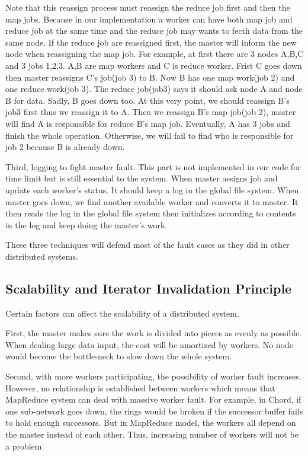 \documentclass[12pt]{article}
\begin{document}
Note that this reassign process must reassign the reduce job first and then the map jobs. Because in our implementation a worker can have both map job and reduce job at the same time and the reduce job may wants to fecth data from the same node. If the reduce job are reassigned first, the master will inform the new node when reassigning the map job. For example, at first there are 3 nodes A,B,C and 3 jobs 1,2,3. A,B are map workers and C is reduce worker. Frist C goes down then master reassigns C's job(job 3) to B. Now B has one map work(job 2) and one reduce work(job 3). The reduce job(job3) says it should ask node A and node B for data. Sadly, B goes down too. At this very point, we should reassign B's job3 first thus we reassign it to A. Then we reassign B's map job(job 2), master will find A is responsible for reduce B's map job. Eventually, A has 3 jobs and finish the whole operation. Otherwise, we will fail to find who is responsible for job 2 because B is already down.

Third, logging to fight master fault. This part is not implemented in our code for time limit but is still essential to the system. When master assigns job and update each worker's status. It should keep a log in the global file system. When master goes down, we find another available worker and converts it to master. It then reads the log in the global file system then initializes according to contents in the log and keep doing the master's work.

These three techniques will defend most of the fault cases as they did in other distributed systems.
   
\subsection{Scalability and Iterator Invalidation Principle}

Certain factors can affect the scalability of a distributed system.
 
First, the master makes sure the work is divided into pieces as evenly as possible. When dealing large data input, the cost will be amortized by
workers. No node would become the bottle-neck to slow down the whole system.
 
Second, with more workers participating, the possibility of worker fault increases. However, no relationship is established between workers which means that MapReduce system can deal with massive worker fault. For example, in Chord, if one sub-network goes down, the rings would be broken if the successor buffer fails to hold enough successors. But in MapReduce model, the workers all depend on the master instead of each other. Thus, increasing number of workers will not be a problem.
\end{document}

